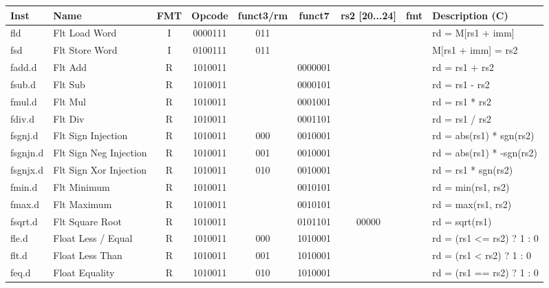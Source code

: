 \begin{center}
\begin{tabular}
{T | l | c | c | c | c | c | c | T } \hline
\rm Inst  & Name                  & FMT   & \rm Opcode & \rm funct3/rm & \rm funct7 & \rm rs2 [20...24] & \rm fmt & \rm Description (C)         \\ \hline
fld       & Flt Load Word         & I     & 0000111    & 011    &        &        & & rd = M[rs1 + imm]    \\
fsd       & Flt Store Word        & I     & 0100111    & 011    &        &        & & M[rs1 + imm] = rs2   \\
\hline
fadd.d    & Flt Add               & R     & 1010011    &        & 0000001 &        & & rd = rs1 + rs2       \\
fsub.d    & Flt Sub               & R     & 1010011    &        & 0000101 &        & & rd = rs1 - rs2       \\
fmul.d    & Flt Mul               & R     & 1010011    &        & 0001001 &        & & rd = rs1 * rs2       \\
fdiv.d    & Flt Div               & R     & 1010011    &        & 0001101 &        & & rd = rs1 / rs2       \\
fsgnj.d   & Flt Sign Injection    & R     & 1010011    & 000    & 0010001 &        & & rd = abs(rs1) * sgn(rs2) \\
fsgnjn.d  & Flt Sign Neg Injection& R     & 1010011    & 001    & 0010001 &        & & rd = abs(rs1) * -sgn(rs2) \\
fsgnjx.d  & Flt Sign Xor Injection& R     & 1010011    & 010    & 0010001 &        & & rd = rs1 * sgn(rs2)  \\
fmin.d    & Flt Minimum           & R     & 1010011    &        & 0010101 &        & & rd = min(rs1, rs2)   \\
fmax.d    & Flt Maximum           & R     & 1010011    &        & 0010101 &        & & rd = max(rs1, rs2)   \\
fsqrt.d   & Flt Square Root       & R     & 1010011    &        & 0101101 & 00000  & & rd = sqrt(rs1)       \\
\hline
fle.d     & Float Less / Equal    & R     & 1010011    & 000    & 1010001 &        & & rd = (rs1 <= rs2) ? 1 : 0\\
flt.d     & Float Less Than       & R     & 1010011    & 001    & 1010001 &        & & rd = (rs1 <  rs2) ? 1 : 0 \\
feq.d     & Float Equality        & R     & 1010011    & 010    & 1010001 &        & & rd = (rs1 == rs2) ? 1 : 0 \\

\end{tabular}
\end{center}
